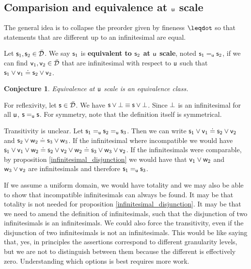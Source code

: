 \documentclass[10pt, onecolumn, nofootinbib]{revtex4-2}
\newtheorem{conj}[equation]{Conjecture}
\begin{document}
\subsection{Comparision and equivalence at $\stmt[u]$ scale}

The general idea is to collapse the preorder given by fineness $\finer$ so that statements that are different up to an infinitesimal are equal.

\def\equivu{\cong_{\stmt[u]}}

\begin{defn}
	Let $\stmt_1, \stmt_2 \in \tdomain$. We say $\stmt_1$ is \textbf{equivalent to $\stmt_2$ at $\stmt[u]$ scale}, noted $\stmt_1 \equ \stmt_2$, if we can find $\stmt[v]_1, \stmt[v]_2 \in \tdomain$ that are infinitesimal with respect to $\stmt[u]$ such that $\stmt_1 \OR \stmt[v]_1 \eqgran \stmt_2 \OR \stmt[v]_2$.
\end{defn}

\begin{conj}
	Equivalence at $\stmt[u]$ scale is an equivalence class.
\end{conj}

\begin{remark}
	For reflexivity, let $\stmt \in \tdomain$. We have $\stmt \OR \impossibility \equiv \stmt \OR \impossibility$. Since $\impossibility$ is an infinitesimal for all $\stmt[u]$, $\stmt \equ \stmt$. For symmetry, note that the definition itself is symmetrical.
	
	Transitivity is unclear. Let $\stmt_1 \equ \stmt_2 \equ \stmt_3$. Then we can write $\stmt_1 \OR \stmt[v]_1 \eqgran \stmt_2 \OR \stmt[v]_2$ and $\stmt_2 \OR \stmt[w]_2 \eqgran \stmt_3 \OR \stmt[w]_3$. If the infinitesimal where incompatible we would have $\stmt_1 \OR \stmt[v]_1 \OR \stmt[w]_2 \eqgran \stmt_2 \OR \stmt[v]_2 \OR \stmt[w]_2 \eqgran \stmt_3 \OR \stmt[w]_3 \OR \stmt[v]_2$. If the infinitesimals were comparable, by proposition \ref{infinitesimal_disjunction} we would have that $\stmt[v]_1 \OR \stmt[w]_2$ and $\stmt[w]_3 \OR \stmt[v]_2$ are infinitesimals and therefore $\stmt_1 \equ \stmt_3$.
	
	If we assume a uniform domain, we would have totality and we may also be able to show that incompatible infinitesimals can always be found. It may be that totality is not needed for proposition \ref{infinitesimal_disjunction}. It may be that we need to amend the definition of infinitesimals, such that the disjunction of two infinitesimals is an infinitesimals. We could also force the transitivity, even if the disjunction of two infinitesimals is not an infinitesimals. This would be like saying that, yes, in principles the assertions correspond to different granularity levels, but we are not to distinguish between them because the different is effectively zero. Understanding which options is best requires more work.
\end{remark}
\end{document}
